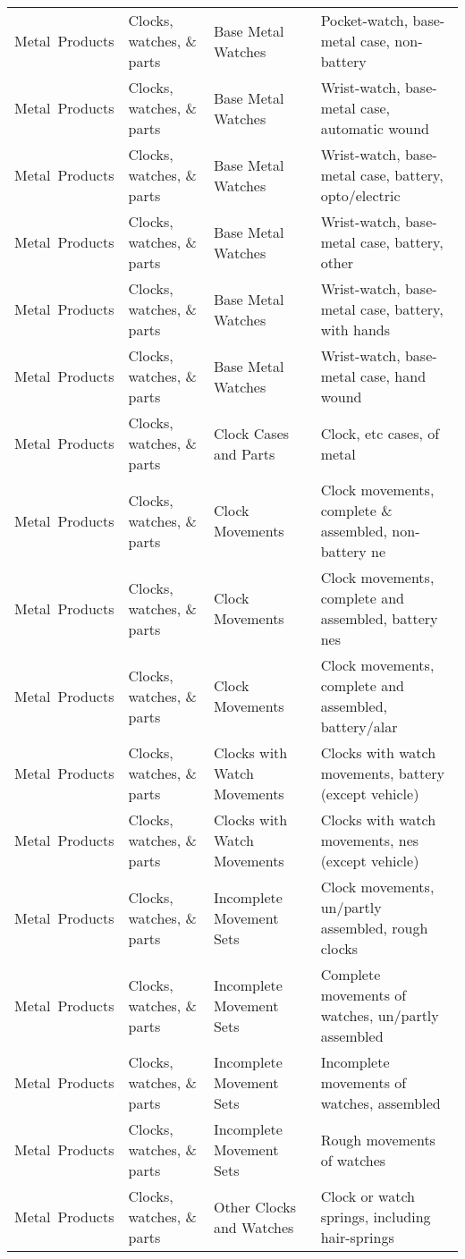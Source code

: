 \begin{appendices}
\begin{xltabular}{\textwidth}{|p{0.10\textwidth}|p{0.25\textwidth}|p{0.20\textwidth}|p{0.35\textwidth}|}
		Metal\ Products & Clocks, watches, \& parts & Base Metal Watches & Pocket-watch, base-metal case, non-battery \\
		Metal\ Products & Clocks, watches, \& parts & Base Metal Watches & Wrist-watch, base-metal case, automatic wound \\
		Metal\ Products & Clocks, watches, \& parts & Base Metal Watches & Wrist-watch, base-metal case, battery, opto/electric \\
		Metal\ Products & Clocks, watches, \& parts & Base Metal Watches & Wrist-watch, base-metal case, battery, other \\
		Metal\ Products & Clocks, watches, \& parts & Base Metal Watches & Wrist-watch, base-metal case, battery, with hands \\
		Metal\ Products & Clocks, watches, \& parts & Base Metal Watches & Wrist-watch, base-metal case, hand wound \\
		Metal\ Products & Clocks, watches, \& parts & Clock Cases and Parts & Clock, etc cases, of metal \\
		Metal\ Products & Clocks, watches, \& parts & Clock Movements & Clock movements, complete \& assembled, non-battery ne \\
		Metal\ Products & Clocks, watches, \& parts & Clock Movements & Clock movements, complete and assembled, battery nes \\
		Metal\ Products & Clocks, watches, \& parts & Clock Movements & Clock movements, complete and assembled, battery/alar \\
		Metal\ Products & Clocks, watches, \& parts & Clocks with Watch Movements & Clocks with watch movements, battery (except vehicle) \\
		Metal\ Products & Clocks, watches, \& parts & Clocks with Watch Movements & Clocks with watch movements, nes (except vehicle) \\
		Metal\ Products & Clocks, watches, \& parts & Incomplete Movement Sets & Clock movements, un/partly assembled, rough clocks \\
		Metal\ Products & Clocks, watches, \& parts & Incomplete Movement Sets & Complete movements of watches, un/partly assembled \\
		Metal\ Products & Clocks, watches, \& parts & Incomplete Movement Sets & Incomplete movements of watches, assembled \\
		Metal\ Products & Clocks, watches, \& parts & Incomplete Movement Sets & Rough movements of watches \\
		Metal\ Products & Clocks, watches, \& parts & Other Clocks and Watches & Clock or watch springs, including hair-springs \\

\end{xltabular}
\end{appendices}
